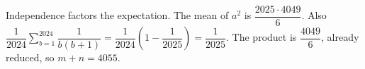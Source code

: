 Independence factors the expectation. The mean of $a^2$ is $\dfrac{2025\cdot4049}{6}$. Also $\dfrac{1}{2024}\sum_{b=1}^{2024}\dfrac{1}{b(b+1)}=\dfrac{1}{2024}(1-\dfrac{1}{2025})=\dfrac{1}{2025}$. The product is $\dfrac{4049}{6}$, already reduced, so $\boxed{m+n=4055}$.
